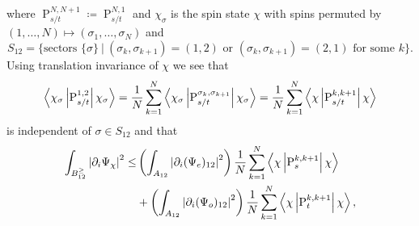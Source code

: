 where $ \operatorname{P}_{s/t}^{N,N+1}\coloneqq \operatorname{P}_{s/t}^{N,1} $ and $ \chi_{\sigma} $ is the spin state $ \chi $ with spins permuted by $ (1,\ldots,N)\mapsto(\sigma_1,\ldots,\sigma_N) $ and 
$$ S_{12}=\{\text{sectors } \{\sigma\}\ \vert\ (\sigma_k,\sigma_{k+1})=(1,2)\text{ or }(\sigma_k,\sigma_{k+1})=(2,1)\text{ for some }k\}. $$
Using translation invariance of $ \chi $ we see that 
$$ \left\langle\chi_{\sigma} \left\lvert \operatorname{P}^{1,2}_{s/t}  \right\rvert \chi_\sigma\right\rangle=\frac{1}{N}\sum_{k=1}^{N}\left\langle\chi_\sigma\left\lvert \operatorname{P}^{\sigma_k,\sigma_{k+1}}_{s/t}  \right\rvert \chi_\sigma\right\rangle=\frac{1}{N}\sum_{k=1}^{N}\left\langle\chi\left\lvert \operatorname{P}^{k,k+1}_{s/t}  \right\rvert \chi\right\rangle $$
is independent of $ \sigma\in S_{12} $ and that
\begin{equation}\label{EqEnergy4Spin1/2}
\begin{aligned}
\int_{B_{12}^{\geq}}\left\lvert \partial_i\Psi_{\chi} \right\rvert^2\leq&\left(\int_{A_{12}}\left\lvert \partial_i(\Psi_e)_{12} \right\rvert^2\right)\frac{1}{N}\sum_{k=1}^{N}\left\langle\chi \left\lvert \operatorname{P}^{k,k+1}_s  \right\rvert \chi\right\rangle\\
&+\left(\int_{A_{12}}\left\lvert \partial_i(\Psi_o)_{12} \right\rvert^2\right)\frac{1}{N}\sum_{k=1}^{N}\left\langle\chi\left\lvert \operatorname{P}^{k,k+1}_t  \right\rvert \chi\right\rangle,
\end{aligned}
\end{equation}


